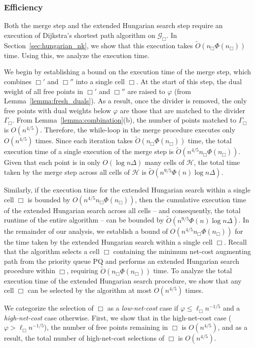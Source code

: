 \documentclass[11pt,onecolumn]{article}
\def\mcG{{\mathcal{G}}}
\def\mcH{{\mathcal{H}}}
\newcommand{\cell}{\Box}
\newcommand{\pq}{\mathrm{PQ}}
\newcommand{\ymax}{\varphi}
\begin{document}
\subsubsection{Efficiency}\label{subsec:efficiency}

Both the merge step and the extended Hungarian search step require an execution of Dijkstra's shortest path algorithm on $\mcG_\cell$. In Section~\ref{sec:hungarian_nk}, we show that this execution takes $\tilde{O}(n_\cell\Phi(n_\cell))$ time. Using this, we analyze the execution time.

We begin by establishing a bound on the execution time of the merge step, which combines $\cell'$ and $\cell''$ into a single cell $\cell$. At the start of this step, the dual weight of all free points in $\cell'$ and $\cell''$ are raised to $\ymax$ (from Lemma~\ref{lemma:fresh_duals}). As a result, once the divider is removed, the only free points with dual weights below $\ymax$ are those that are matched to the divider $\Gamma_\cell$.  From Lemma~\ref{lemma:combination}(b), the number of points matched to $\Gamma_\cell$ is $O(n^{4/5})$. Therefore, the while-loop in the merge procedure executes only $O(n^{4/5})$ times. Since each iteration takes $\tilde{O}(n_\cell\Phi(n_\cell))$ time, the total execution time of a single execution of the merge step is $\tilde{O}(n^{4/5}n_\cell \Phi(n_\cell))$. 
Given that each point is in only $O(\log n\Delta)$ many cells of $\mcH$, the total time taken by the merge step across all cells of $\mcH$ is $\tilde{O}(n^{9/5}\Phi(n)\log n\Delta)$.

Similarly, if the execution time for the extended Hungarian search within a single cell $\cell$ is bounded by $O(n^{4/5}n_\cell \Phi(n_\cell))$, then the cumulative execution time of the extended Hungarian search across all cells -- and consequently, the total runtime of the entire algorithm -- can be bounded by $\tilde{O}(n^{9/5}\Phi(n)\log n\Delta)$.
In the remainder of our analysis, we establish a bound of $O(n^{4/5}n_\cell \Phi(n_\cell))$ for the time taken by the extended Hungarian search within a single cell $\cell$.
Recall that the algorithm selects a cell $\cell$ containing the minimum net-cost augmenting path from the priority queue $\pq$ and performs an extended Hungarian search procedure within $\cell$, requiring $\tilde{O}(n_\cell\Phi(n_\cell))$ time. To analyze the total execution time of the extended Hungarian search procedure, we show that any cell $\cell$ can be selected by the algorithm at most $O(n^{4/5})$ times.

We categorize the selection of $\cell$ as a \emph{low-net-cost} case if $\ymax\le \ell_\cell n^{-1/5}$ and a \emph{high-net-cost} case otherwise. First, we show that in the high-net-cost case ($\ymax>\ell_\cell n^{-1/5}$), the number of free points remaining in $\cell$ is $O(n^{4/5})$, and as a result, the total number of high-net-cost selections of $\cell$ is $O(n^{4/5})$.
\end{document}
